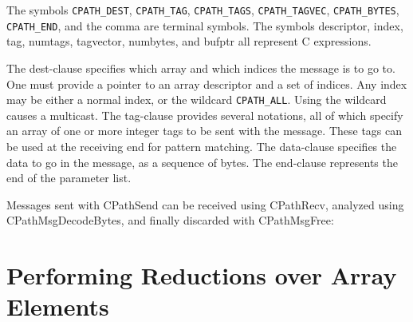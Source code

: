 The symbols {\tt CPATH\_DEST}, {\tt CPATH\_TAG}, {\tt CPATH\_TAGS},
{\tt CPATH\_TAGVEC}, {\tt CPATH\_BYTES}, {\tt CPATH\_END}, and the
comma are terminal symbols.  The symbols descriptor, index, tag,
numtags, tagvector, numbytes, and bufptr all represent C expressions.

The dest-clause specifies which array and which indices the message is
to go to.  One must provide a pointer to an array descriptor and a set
of indices.  Any index may be either a normal index, or the wildcard
{\tt CPATH\_ALL}.  Using the wildcard causes a multicast.  The
tag-clause provides several notations, all of which specify an array
of one or more integer tags to be sent with the message.  These tags
can be used at the receiving end for pattern matching.  The
data-clause specifies the data to go in the message, as a sequence of
bytes.  The end-clause represents the end of the parameter list.

Messages sent with CPathSend can be received using CPathRecv, analyzed
using CPathMsgDecodeBytes, and finally discarded with CPathMsgFree:




\section{Performing Reductions over Array Elements}

